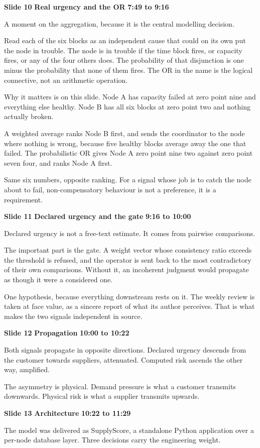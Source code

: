 \documentclass[a4paper,12pt]{article}
\newcommand{\SlideHeading}[3]{%
  \needspace{4\baselineskip}%
  \vspace{10pt}%
  \noindent\colorbox{altenBlueBg}{%
    \parbox{\dimexpr\linewidth-2\fboxsep}{%
      \vspace{3pt}%
      \textbf{\large\color{altenNavy}#1}\quad
      \textbf{\large\color{altenAzureDark}#2}%
      \hfill\textbf{\color{altenAzure}#3}%
      \vspace{3pt}}}%
  \vspace{5pt}\par}
\begin{document}
\SlideHeading{Slide 10}{Real urgency and the OR}{7:49 to 9:16}
A moment on the aggregation, because it is the central modelling decision.

Read each of the six blocks as an independent cause that could on its own put the node in trouble. The node is in trouble if the time block fires, or capacity fires, or any of the four others does. The probability of that disjunction is one minus the probability that none of them fires. The OR in the name is the logical connective, not an arithmetic operation.

Why it matters is on this slide. Node A has capacity failed at zero point nine and everything else healthy. Node B has all six blocks at zero point two and nothing actually broken.

A weighted average ranks Node B first, and sends the coordinator to the node where nothing is wrong, because five healthy blocks average away the one that failed. The probabilistic OR gives Node A zero point nine two against zero point seven four, and ranks Node A first.

Same six numbers, opposite ranking. For a signal whose job is to catch the node about to fail, non-compensatory behaviour is not a preference, it is a requirement.

\SlideHeading{Slide 11}{Declared urgency and the gate}{9:16 to 10:00}
Declared urgency is not a free-text estimate. It comes from pairwise comparisons.

The important part is the gate. A weight vector whose consistency ratio exceeds the threshold is refused, and the operator is sent back to the most contradictory of their own comparisons. Without it, an incoherent judgment would propagate as though it were a considered one.

One hypothesis, because everything downstream rests on it. The weekly review is taken at face value, as a sincere report of what its author perceives. That is what makes the two signals independent in source.

\SlideHeading{Slide 12}{Propagation}{10:00 to 10:22}
Both signals propagate in opposite directions. Declared urgency descends from the customer towards suppliers, attenuated. Computed risk ascends the other way, amplified.

The asymmetry is physical. Demand pressure is what a customer transmits downwards. Physical risk is what a supplier transmits upwards.

\SlideHeading{Slide 13}{Architecture}{10:22 to 11:29}
The model was delivered as SupplyScore, a standalone Python application over a per-node database layer. Three decisions carry the engineering weight.
\end{document}
